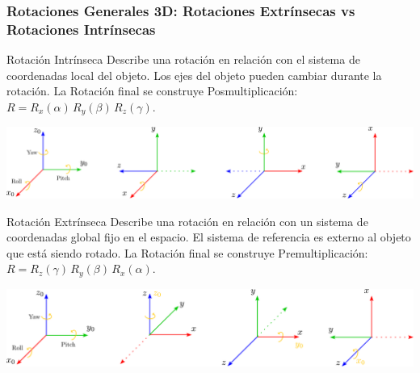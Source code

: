 \begin{frame}
    \frametitle{Rotaciones Generales 3D: Rotaciones Extrínsecas vs Rotaciones Intrínsecas}
    \scriptsize
    \begin{block}{Rotación Intrínseca}
    Describe una rotación en relación con el sistema de coordenadas local del objeto. Los ejes del objeto pueden cambiar durante la rotación. La Rotación final se construye Posmultiplicación: $R = R_{x}(\alpha) \, R_{y}(\beta) \, R_{z}(\gamma)$.
    \end{block}

    \begin{center}
        \includegraphics[width=0.7\columnwidth]{./images/intrinsic_rotation.pdf}
    \end{center}

    \begin{block}{Rotación Extrínseca}
        Describe una rotación en relación con un sistema de coordenadas global fijo en el espacio. El sistema de referencia es externo al objeto que está siendo rotado. La Rotación final se construye Premultiplicación: $R = R_{z}(\gamma) \, R_{y}(\beta) \, R_{x}(\alpha)$.
    \end{block}
    
    \begin{center}
        \includegraphics[width=0.7\columnwidth]{./images/extrinsic_rotation.pdf}
    \end{center}
        
    
    
\end{frame}

